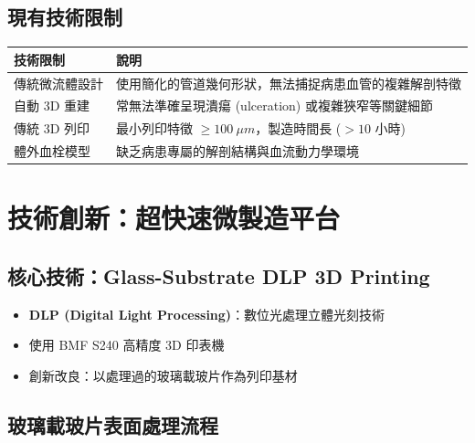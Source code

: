 \documentclass[12pt,a4paper]{article}
\begin{document}
\subsection{現有技術限制}

\begin{longtable}{p{5cm}p{9cm}}
\toprule
\textbf{技術限制} & \textbf{說明} \\
\midrule
\endhead
傳統微流體設計 & 使用簡化的管道幾何形狀，無法捕捉病患血管的複雜解剖特徵 \\
\midrule
自動 3D 重建 & 常無法準確呈現潰瘍 (ulceration) 或複雜狹窄等關鍵細節 \\
\midrule
傳統 3D 列印 & 最小列印特徵 $\geq 100\ \mu m$，製造時間長 ($>10$ 小時) \\
\midrule
體外血栓模型 & 缺乏病患專屬的解剖結構與血流動力學環境 \\
\bottomrule
\end{longtable}

\section{技術創新：超快速微製造平台}

\subsection{核心技術：Glass-Substrate DLP 3D Printing}

\begin{itemize}
    \item \textbf{DLP (Digital Light Processing)}：數位光處理立體光刻技術
    \item 使用 BMF S240 高精度 3D 印表機
    \item 創新改良：以處理過的玻璃載玻片作為列印基材
\end{itemize}


\subsection{玻璃載玻片表面處理流程}
\end{document}
